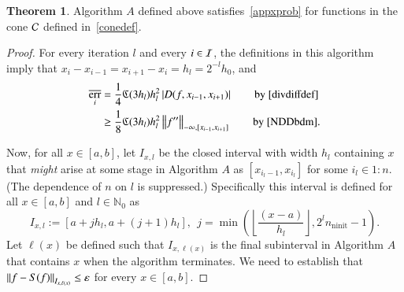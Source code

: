 \documentclass[review]{elsarticle}
\newcommand{\abstol}{\varepsilon}
\newcommand{\oton}{1\!:\!n}
\theoremstyle{definition}
\newcommand{\Ixl}{I_{x,l}}
\DeclareMathOperator{\ninit}{ninit}
\DeclareMathOperator{\oerr}{\overline{err}}
\newtheorem{theorem}{Theorem}
\begin{document}
\begin{theorem} \label{thm:algAworks}
	Algorithm $A$ defined above satisfies~\eqref{appxprob} for functions in the
	cone $\mathcal{C}$ defined in~\eqref{conedef}.
\end{theorem}

\begin{proof}
For every iteration $l$ and every $i \in \mathcal{I}$, the definitions in this algorithm
imply that $x_i-x_{i-1} = x_{i+1} - x_i = h_l = 2^{-l}h_0$, and
	\begin{align}
	\oerr_i
	& =  \frac{1}{4} \fC(3h_l) h_l^2 \abs{D(f,x_{i-1},x_{i+1})}
	\qquad \text{by \eqref{divdiffdef}}  \label{divdiffbd}\\
	& \ge \frac{1} 8 \fC(3h_l) h_l^2 \norm[-\infty,{[x_{i-1},x_{i+1}]}]{f''}
	\qquad \text{by \eqref{NDDbdm}}. \label{oerrlobd}
	\end{align}
	
Now, for all $x \in [a,b]$, let $\Ixl$ be the closed interval with width $h_l$
containing $x$ that \emph{might} arise at some stage in Algorithm $A$ as $[x_{i_l-1},
x_{i_l}]$ for some $i_l \in \oton$. (The dependence of $n$ on $l$ is
suppressed.) Specifically this interval is defined for all $ x \in [a,b]$ and $l
\in \mathbb{N}_0$ as
	\begin{equation}\label{Ixldef}
	\Ixl := \left[a+jh_l,a+(j+1) h_l\right], \ \ j=\min \left(\left\lfloor\frac{(x-a)}{h_l}\right\rfloor,
	2^l n_{\ninit}-1 \right ).
	\end{equation}
Let $\ell(x)$ be defined such that $I_{x,\ell(x)}$ is the final subinterval in
Algorithm $A$ that contains $x$ when the algorithm terminates. We need to
establish that $\norm[I_{x,\ell(x)}]{f - S(f)} \le \abstol$ for every $x \in
[a,b]$.


\end{proof}
\end{document}
